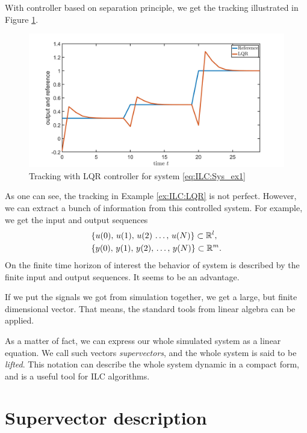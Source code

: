 \begin{exam}
With controller based on separation principle, we get the tracking illustrated in  Figure \ref{img:ILC:LQR_control}.
\begin{figure}[ht]
	\centering
	\includegraphics[width=\textwidth]{fig/Ex1_LQR.jpg}
	\caption{Tracking with LQR controller for system \eqref{eq:ILC:Sys_ex1}}
	\label{img:ILC:LQR_control}
\end{figure}
\end{exam}



As one can see, the tracking in Example \ref{ex:ILC:LQR} is not perfect. However, we can extract a bunch of information from this controlled system. For example, we get the input and output sequences 
\begin{align}
&\{u(0), \, u(1), \,  u(2) \, \dots , \, u(N)\} \subset {\mathbb{R}}^l \label{eq:ILC:u_seq}, \\
&\{y(0), \, y(1), \, y(2) , \, \dots , \, y(N)\}\subset {\mathbb{R}}^m.\label{eq:ILC:y_seq}
\end{align}
On the finite time horizon of interest the behavior of system is described by the finite input and output sequences. It seems to be an advantage. 

If we put the signals we got from simulation together, we get a large, but finite dimensional vector. That means, the standard tools from linear algebra can be applied. 

As a matter of fact, we can express our whole simulated system as a linear equation. We call such vectors \textit{supervectors}, and the whole system is said to be \textit{lifted}. This notation can describe the whole system dynamic in a compact form, and is a useful tool for ILC algorithms. 

\section{Supervector description} 

